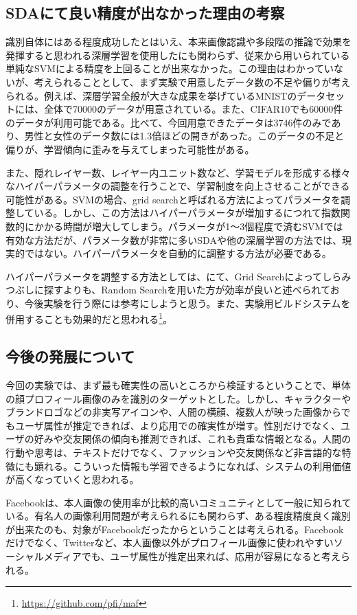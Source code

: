 \subsection{SDAにて良い精度が出なかった理由の考察}
識別自体にはある程度成功したとはいえ、本来画像認識や多段階の推論で効果を発揮すると思われる深層学習を使用したにも関わらず、従来から用いられている単純なSVMによる精度を上回ることが出来なかった。この理由はわかっていないが、考えられることとして、まず実験で用意したデータ数の不足や偏りが考えられる。例えば、深層学習全般が大きな成果を挙げているMNISTのデータセットには、全体で70000のデータが用意されている。また、CIFAR10でも60000件のデータが利用可能である。比べて、今回用意できたデータは3746件のみであり、男性と女性のデータ数には1.3倍ほどの開きがあった。このデータの不足と偏りが、学習傾向に歪みを与えてしまった可能性がある。\par
また、隠れレイヤー数、レイヤー内ユニット数など、学習モデルを形成する様々なハイパーパラメータの調整を行うことで、学習制度を向上させることができる可能性がある。SVMの場合、grid searchと呼ばれる方法によってパラメータを調整している。しかし、この方法はハイパーパラメータが増加するにつれて指数関数的にかかる時間が増大してしまう。パラメータが1〜3個程度で済むSVMでは有効な方法だが、パラメータ数が非常に多いSDAや他の深層学習の方法では、現実的ではない。ハイパーパラメータを自動的に調整する方法が必要である。\par
ハイパーパラメータを調整する方法としては、\cite{bengio2012practical}にて、Grid Searchによってしらみつぶしに探すよりも、Random Searchを用いた方が効率が良いと述べられており、今後実験を行う際には参考にしようと思う。また、実験用ビルドシステムを併用することも効果的だと思われる\footnote{\url{https://github.com/pfi/maf}}。

\subsection{今後の発展について}
今回の実験では、まず最も確実性の高いところから検証するということで、単体の顔プロフィール画像のみを識別のターゲットとした。しかし、キャラクターやブランドロゴなどの非実写アイコンや、人間の横顔、複数人が映った画像からでもユーザ属性が推定できれば、より応用での確実性が増す。性別だけでなく、ユーザの好みや交友関係の傾向も推測できれば、これも貴重な情報となる。人間の行動や思考は、テキストだけでなく、ファッションや交友関係など非言語的な特徴にも顕れる。こういった情報も学習できるようになれば、システムの利用価値が高くなっていくと思われる。\par
Facebookは、本人画像の使用率が比較的高いコミュニティとして一般に知られている。有名人の画像利用問題が考えられるにも関わらず、ある程度精度良く識別が出来たのも、対象がFacebookだったからということは考えられる。Facebookだけでなく、Twitterなど、本人画像以外がプロフィール画像に使われやすいソーシャルメディアでも、ユーザ属性が推定出来れば、応用が容易になると考えられる。
